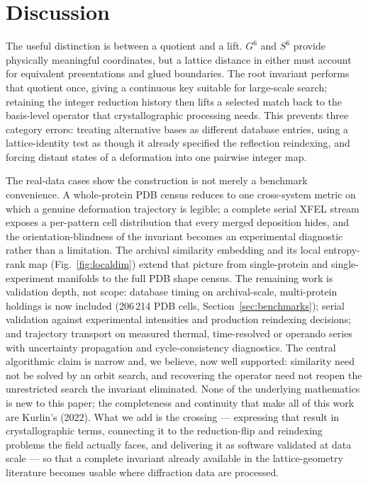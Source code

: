\documentclass[11pt]{article}
\begin{document}
\section{Discussion}

The useful distinction is between a quotient and a lift. $G^6$ and $S^6$ provide
physically meaningful coordinates, but a lattice distance in either must account
for equivalent presentations and glued boundaries. The root invariant performs
that quotient once, giving a continuous key suitable for large-scale search;
retaining the integer reduction history then lifts a selected match back to the
basis-level operator that crystallographic processing needs. This prevents three
category errors: treating alternative bases as different database entries, using
a lattice-identity test as though it already specified the reflection reindexing,
and forcing distant states of a deformation into one pairwise integer map.

The real-data cases show the construction is not merely a benchmark convenience.
A whole-protein PDB census reduces to one cross-system metric on which a genuine
deformation trajectory is legible; a complete serial XFEL stream exposes a
per-pattern cell distribution that every merged deposition hides, and the
orientation-blindness of the invariant becomes an experimental diagnostic rather
than a limitation. The archival similarity embedding and its local entropy-rank map
(Fig.~\ref{fig:localdim}) extend that picture from single-protein and single-
experiment manifolds to the full PDB shape census. The remaining work is
validation depth, not scope: database timing on archival-scale, multi-protein
holdings is now included (206\,214 PDB cells, Section~\ref{sec:benchmarks});
serial validation against experimental intensities and production reindexing
decisions; and trajectory transport on measured thermal, time-resolved or
operando series with uncertainty propagation and cycle-consistency diagnostics. The central algorithmic claim is
narrow and, we believe, now well supported: similarity need not be solved by an
orbit search, and recovering the operator need not reopen the unrestricted search
the invariant eliminated. None of the underlying mathematics is new to this
paper; the completeness and continuity that make all of this work are Kurlin's
(2022). What we add is the crossing --- expressing that result in crystallographic
terms, connecting it to the reduction-flip and reindexing problems the field
actually faces, and delivering it as software validated at data scale --- so that
a complete invariant already available in the lattice-geometry literature becomes
usable where diffraction data are processed.
\end{document}
